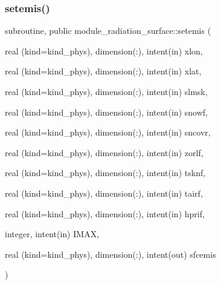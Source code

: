\subsubsection{\texorpdfstring{setemis()}{setemis()}}
{\footnotesize\ttfamily subroutine, public module\+\_\+radiation\+\_\+surface\+::setemis (\begin{DoxyParamCaption}\item[{real (kind=kind\+\_\+phys), dimension(\+:), intent(in)}]{xlon,  }\item[{real (kind=kind\+\_\+phys), dimension(\+:), intent(in)}]{xlat,  }\item[{real (kind=kind\+\_\+phys), dimension(\+:), intent(in)}]{slmsk,  }\item[{real (kind=kind\+\_\+phys), dimension(\+:), intent(in)}]{snowf,  }\item[{real (kind=kind\+\_\+phys), dimension(\+:), intent(in)}]{sncovr,  }\item[{real (kind=kind\+\_\+phys), dimension(\+:), intent(in)}]{zorlf,  }\item[{real (kind=kind\+\_\+phys), dimension(\+:), intent(in)}]{tsknf,  }\item[{real (kind=kind\+\_\+phys), dimension(\+:), intent(in)}]{tairf,  }\item[{real (kind=kind\+\_\+phys), dimension(\+:), intent(in)}]{hprif,  }\item[{integer, intent(in)}]{I\+M\+AX,  }\item[{real (kind=kind\+\_\+phys), dimension(\+:), intent(out)}]{sfcemis }\end{DoxyParamCaption})}


